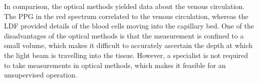 In comparison, the optical methods yielded data about the venous circulation. The PPG in the red spectrum correlated to the venous circulation, whereas the LDF provided details of the blood cells moving into the capillary bed. One of the disadvantages of the optical methods is that the measurement is confined to a small volume, which makes it difficult to accurately ascertain the depth at which the light beam is travelling into the tissue. However, a specialist is not required to take measurements in optical methods, which makes it feasible for an unsupervised operation.




